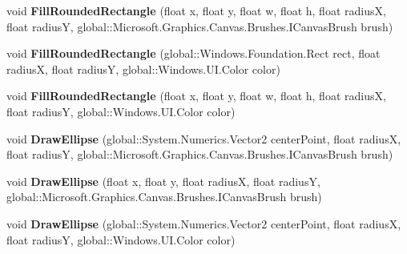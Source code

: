 \begin{DoxyCompactItemize}
void {\bfseries Fill\+Rounded\+Rectangle} (float x, float y, float w, float h, float radiusX, float radiusY, global\+::\+Microsoft.\+Graphics.\+Canvas.\+Brushes.\+I\+Canvas\+Brush brush)
\item 
\mbox{\label{class_microsoft_1_1_graphics_1_1_canvas_1_1_canvas_drawing_session_a1c3e76cfb27814bd529cd24605b7c6e1}} 
void {\bfseries Fill\+Rounded\+Rectangle} (global\+::\+Windows.\+Foundation.\+Rect rect, float radiusX, float radiusY, global\+::\+Windows.\+U\+I.\+Color color)
\item 
\mbox{\label{class_microsoft_1_1_graphics_1_1_canvas_1_1_canvas_drawing_session_a41c62f5f89f33e35b17d75b45871c5c8}} 
void {\bfseries Fill\+Rounded\+Rectangle} (float x, float y, float w, float h, float radiusX, float radiusY, global\+::\+Windows.\+U\+I.\+Color color)
\item 
\mbox{\label{class_microsoft_1_1_graphics_1_1_canvas_1_1_canvas_drawing_session_af313d4d667b4a1512ff9a25e74f321f7}} 
void {\bfseries Draw\+Ellipse} (global\+::\+System.\+Numerics.\+Vector2 center\+Point, float radiusX, float radiusY, global\+::\+Microsoft.\+Graphics.\+Canvas.\+Brushes.\+I\+Canvas\+Brush brush)
\item 
\mbox{\label{class_microsoft_1_1_graphics_1_1_canvas_1_1_canvas_drawing_session_a6e9c150ed00b003555ff6a9cd5ccbdc2}} 
void {\bfseries Draw\+Ellipse} (float x, float y, float radiusX, float radiusY, global\+::\+Microsoft.\+Graphics.\+Canvas.\+Brushes.\+I\+Canvas\+Brush brush)
\item 
\mbox{\label{class_microsoft_1_1_graphics_1_1_canvas_1_1_canvas_drawing_session_a6defe04021c4bbef0f3b5437dc2db4e3}} 
void {\bfseries Draw\+Ellipse} (global\+::\+System.\+Numerics.\+Vector2 center\+Point, float radiusX, float radiusY, global\+::\+Windows.\+U\+I.\+Color color)
\item 
\mbox{\label{class_microsoft_1_1_graphics_1_1_canvas_1_1_canvas_drawing_session_a5993baa57c0ba821debd8e2fb78bae21}} 

\end{DoxyCompactItemize}
